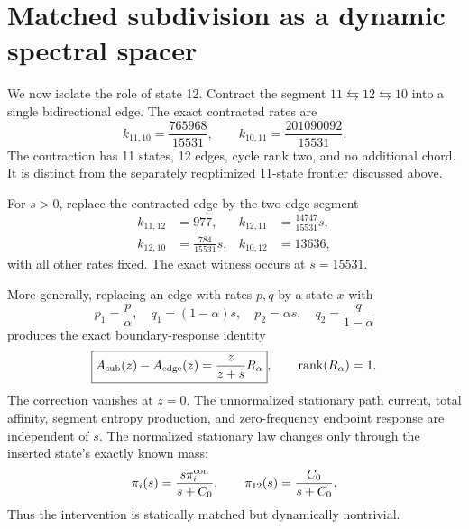 \documentclass[aps,pre,reprint,groupedaddress,nofootinbib,showkeys,floatfix]{revtex4-2}
\begin{document}
\section{Matched subdivision as a dynamic spectral spacer}
We now isolate the role of state 12. Contract the segment $11\leftrightarrows12\leftrightarrows10$ into a single bidirectional edge. The exact contracted rates are
\begin{equation}
k_{11,10}=\frac{765968}{15531},\qquad
k_{10,11}=\frac{201090092}{15531}.
\end{equation}
The contraction has 11 states, 12 edges, cycle rank two, and no additional chord. It is distinct from the separately reoptimized 11-state frontier discussed above.

For $s>0$, replace the contracted edge by the two-edge segment
\begin{align}
k_{11,12}&=977, & k_{12,11}&=\frac{14747}{15531}s,\\
k_{12,10}&=\frac{784}{15531}s, & k_{10,12}&=13636,
\end{align}
with all other rates fixed. The exact witness occurs at $s=15531$.

More generally, replacing an edge with rates $p,q$ by a state $x$ with
\begin{equation}
p_1=\frac p\alpha,\quad q_1=(1-\alpha)s,\quad
p_2=\alpha s,\quad q_2=\frac q{1-\alpha}
\end{equation}
produces the exact boundary-response identity
\begin{equation}
\boxed{A_{\rm sub}(z)-A_{\rm edge}(z)=\frac{z}{z+s}R_\alpha},
\qquad \mathrm{rank}(R_\alpha)=1.
\label{eq:spacer}
\end{equation}
The correction vanishes at $z=0$. The unnormalized stationary path current, total affinity, segment entropy production, and zero-frequency endpoint response are independent of $s$. The normalized stationary law changes only through the inserted state's exactly known mass:
\begin{equation}
\pi_i(s)=\frac{s\pi_i^{\rm con}}{s+C_0},\qquad
\pi_{12}(s)=\frac{C_0}{s+C_0}.
\end{equation}
Thus the intervention is statically matched but dynamically nontrivial.
\end{document}
